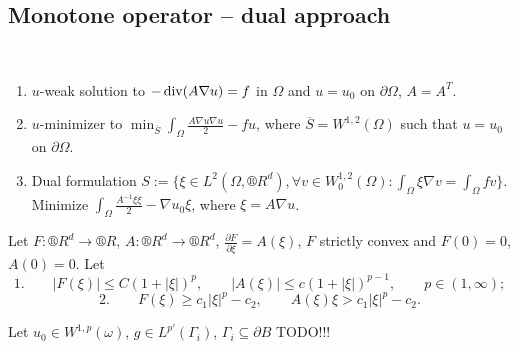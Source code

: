 \documentclass[12pt]{article}					%
\begin{document}
\subsection{Monotone operator – dual approach}
\begin{poznamka}
	\ 
	\begin{enumerate}
		\item $u$-weak solution to $- \operatorname{div}(A \nabla u) = f$ in $Ω$ and $u = u_0$ on $\partial Ω$, $A = A^T$.
		\item $u$-minimizer to $\min_{\overline{S}} \int_Ω \frac{A \nabla u \nabla u}{2} - f u$, where $\overline{S} = W^{1, 2}(Ω)$ such that $u = u_0$ on $\partial Ω$.
		\item Dual formulation $S := \{ξ \in L^2(Ω, ®R^d), \forall v \in W_0^{1, 2}(Ω): \int_Ω ξ \nabla v = \int_Ω f v\}$. Minimize $\int_Ω \frac{A^{-1} ξ ξ}{2} - \nabla u_0 ξ$, where $ξ = A \nabla u$.
	\end{enumerate}
\end{poznamka}

\begin{veta}
	Let $F: ®R^d \rightarrow ®R$, $A: ®R^d \rightarrow ®R^d$, $\frac{\partial F}{\partial ξ} = A(ξ)$, $F$ strictly convex and $F(0) = 0$, $A(0) = 0$. Let
	$$ 1. \qquad |F(ξ)| ≤ C(1 + |ξ|)^p, \qquad |A(ξ)| ≤ c(1 + |ξ|)^{p - 1}, \qquad p \in (1, ∞); $$
	$$ 2. \qquad F(ξ) ≥ c_1|ξ|^p - c_2, \qquad A(ξ)ξ > c_1|ξ|^p - c_2. $$

	Let $u_0 \in W^{1, p}(ω)$, $g \in L^{p'}(Γ_i)$, $Γ_i \subseteq \partial B$ TODO!!!
\end{veta}
\end{document}
